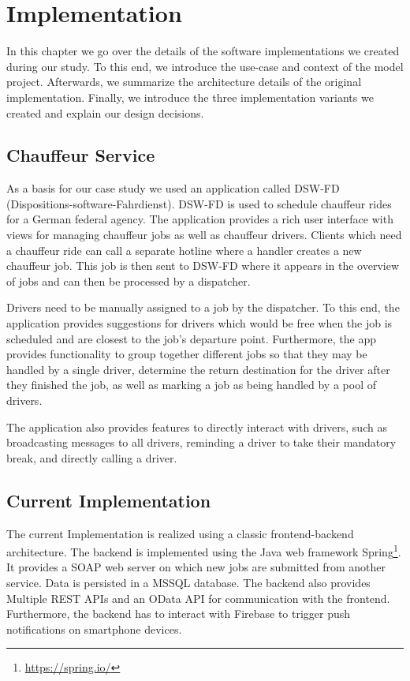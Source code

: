 \chapter{Implementation}
\label{ch:implementation}
In this chapter we go over the details of the software implementations we created during our study. To this end, we introduce the use-case and context of the model project. Afterwards, we summarize the architecture details of the original implementation. Finally, we introduce the three implementation variants we created and explain our design decisions.  

\section{Chauffeur Service}
As a basis for our case study we used an application called DSW-FD (Dispositions-software-Fahrdienst). DSW-FD is used to schedule chauffeur rides for a German federal agency. The application provides a rich user interface with views for managing chauffeur jobs as well as chauffeur drivers. Clients which need a chauffeur ride can call a separate hotline where a handler creates a new chauffeur job. This job is then sent to DSW-FD where it appears in the overview of jobs and can then be processed by a dispatcher.

Drivers need to be manually assigned to a job by the dispatcher. To this end, the application provides suggestions for drivers which would be free when the job is scheduled and are closest to the job's departure point. Furthermore, the app provides functionality to group together different jobs so that they may be handled by a single driver, determine the return destination for the driver after they finished the job, as well as marking a job as being handled by a pool of drivers.

The application also provides features to directly interact with drivers, such as broadcasting messages to all drivers, reminding a driver to take their mandatory break, and directly calling a driver.

\section{Current Implementation}
The current Implementation is realized using a classic frontend-backend architecture. The backend is implemented using the Java web framework Spring\footnote{\url{https://spring.io/}}. It provides a SOAP web server on which new jobs are submitted from another service. Data is persisted in a MSSQL database. The backend also provides Multiple REST APIs and an OData API for communication with the frontend. Furthermore, the backend has to interact with Firebase to trigger push notifications on smartphone devices.

